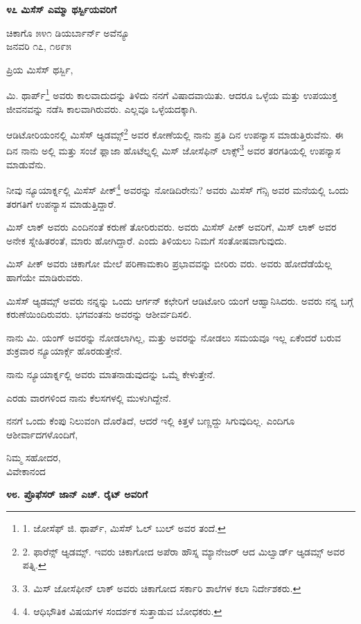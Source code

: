 \begin{center}
\textbf{೪೭ ಮಿಸೆಸ್ ಎಮ್ಮಾ ಥರ್ಸ್ಬಿಯವರಿಗೆ}
\end{center}

\begin{flushright}
ಚಿಕಾಗೊ ೫೪೧ ಡಿಯರ್ಬಾರ್ನ್ ಅವೆನ್ಯೂ\\ಜನವರಿ ೧೭, ೧೮೯೫
\end{flushright}

ಪ್ರಿಯ ಮಿಸೆಸ್ ಥರ್ಸ್ಬಿ,

ಮಿ. ಥಾರ್ಪ್\footnote{1. ಜೋಸೆಫ್ ಜಿ. ಥಾರ್ಪ್, ಮಿಸೆಸ್ ಓಲ್ ಬುಲ್ ಅವರ ತಂದೆ.} ಅವರು ಕಾಲವಾದುದನ್ನು ತಿಳಿದು ನನಗೆ ವಿಷಾದವಾಯಿತು. ಆದರೂ ಒಳ್ಳೆಯ ಮತ್ತು ಉಪಯುಕ್ತ ಜೀವನವನ್ನು ನಡೆಸಿ ಕಾಲವಾಗಿರುವರು. ಎಲ್ಲವೂ ಒಳ್ಳೆಯದಕ್ಕಾಗಿ.

ಆಡಿಟೋರಿಯಂನಲ್ಲಿ ಮಿಸೆಸ್ ಆ್ಯಡಮ್ಸ್\footnote{2. ಫಾರೆನ್ಸ್ ಆ್ಯಡಮ್ಸ್. ಇವರು ಚಿಕಾಗೋದ ಅಪೆರಾ ಹೌಸ್ನ ಮ್ಯಾನೇಜರ್ ಆದ ಮಿಲ್ವಾರ್ಡ್ ಆ್ಯಡಮ್ಸ್ ಅವರ ಪತ್ನಿ.} ಅವರ ಕೋಣೆಯಲ್ಲಿ ನಾನು ಪ್ರತಿ ದಿನ ಉಪನ್ಯಾಸ ಮಾಡುತ್ತಿರುವೆನು. ಈ ದಿನ ನಾನು ಅಲ್ಲಿ ಮತ್ತು ಸಂಜೆ ಫ್ಲಾಜಾ ಹೊಟೆಲ್ನಲ್ಲಿ ಮಿಸ್ ಜೋಸೆಫಿನ್ ಲಾಕ್ಸ್\footnote{3. ಮಿಸ್ ಜೋಸೆಫೀನ್ ಲಾಕ್ ಅವರು ಚಿಕಾಗೋದ ಸರ್ಕಾರಿ ಶಾಲೆಗಳ ಕಲಾ ನಿರ್ದೇಶಕರು.} ಅವರ ತರಗತಿಯಲ್ಲಿ ಉಪನ್ಯಾಸ ಮಾಡುವೆನು.

ನೀವು ನ್ಯೂಯಾರ್ಕ್ನಲ್ಲಿ ಮಿಸೆಸ್ ಪೀಕ್\footnote{4. ಆಧಿಭೌತಿಕ ವಿಷಯಗಳ ಸಂದರ್ಶಕ ಸುತ್ತಾಡುವ ಬೋಧಕರು.} ಅವರನ್ನು ನೋಡಿದಿರೇನು? ಅವರು ಮಿಸೆಸ್ ಗೆನ್ಸಿ ಅವರ ಮನೆಯಲ್ಲಿ ಒಂದು ತರಗತಿಗೆ ಉಪನ್ಯಾಸ ಮಾಡುತ್ತಿದ್ದಾರೆ.

ಮಿಸ್ ಲಾಕ್ ಅವರು ಎಂದಿನಂತೆ ಕರುಣೆ ತೋರಿರುವರು. ಅವರು ಮಿಸೆಸ್ ಪೀಕ್ ಅವರಿಗೆ, ಮಿಸ್ ಲಾಕ್ ಅವರ ಅನೇಕ ಸ್ನೇಹಿತರಂತೆ, ಮಾರು ಹೋಗಿದ್ದಾರೆ. ಎಂದು ತಿಳಿಯಲು ನಿಮಗೆ ಸಂತೋಷವಾಗುವುದು.

ಮಿಸ್ ಪೀಕ್ ಅವರು ಚಿಕಾಗೋ ಮೇಲೆ ಪರಿಣಾಮಕಾರಿ ಪ್ರಭಾವವನ್ನು ಬೀರಿರು ವರು. ಅವರು ಹೋದೆಡೆಯೆಲ್ಲ ಹಾಗೆಯೇ ಮಾಡಿರುವರು.

ಮಿಸೆಸ್ ಆ್ಯಡಮ್ಸ್ ಅವರು ನನ್ನನ್ನು ಒಂದು ಆರ್ಗನ್ ಕಛೇರಿಗೆ ಆಡಿಟೋರಿ ಯಂಗೆ ಆಹ್ವಾನಿಸಿದರು. ಅವರು ನನ್ನ ಬಗ್ಗೆ ಕರುಣೆಯಿಂದಿರುವರು. ಭಗವಂತನು ಅವರನ್ನು ಆಶೀರ್ವದಿಸಲಿ.

ನಾನು ಮಿ. ಯಂಗ್ ಅವರನ್ನು ನೋಡಲಾಗಿಲ್ಲ, ಮತ್ತು ಅವರನ್ನು ನೋಡಲು ಸಮಯವೂ ಇಲ್ಲ ಏಕೆಂದರೆ ಬರುವ ಶುಕ್ರವಾರ ನ್ಯೂಯಾರ್ಕ್ಗೆ ಹೊರಡುತ್ತೇನೆ.

ನಾನು ನ್ಯೂಯಾರ್ಕ್ನಲ್ಲಿ ಅವರು ಮಾತನಾಡುವುದನ್ನು ಒಮ್ಮೆ ಕೇಳುತ್ತೇನೆ.

ಎರಡು ವಾರಗಳಿಂದ ನಾನು ಕೆಲಸಗಳಲ್ಲಿ ಮುಳುಗಿದ್ದೇನೆ.

ನನಗೆ ಒಂದು ಕೆಂಪು ನಿಲುವಂಗಿ ದೊರೆತಿದೆ, ಆದರೆ ಇಲ್ಲಿ ಕಿತ್ತಳೆ ಬಣ್ಣದ್ದು ಸಿಗುವುದಿಲ್ಲ. ಎಂದಿಗೂ ಆಶೀರ್ವಾದಗಳೊಂದಿಗೆ,

\begin{flushright}
ನಿಮ್ಮ ಸಹೋದರ,\\ವಿವೇಕಾನಂದ
\end{flushright}

\begin{center}
\textbf{೪೮. ಪ್ರೊಫೆಸರ್ ಜಾನ್ ಎಚ್. ರೈಟ್ ಅವರಿಗೆ}
\end{center}

